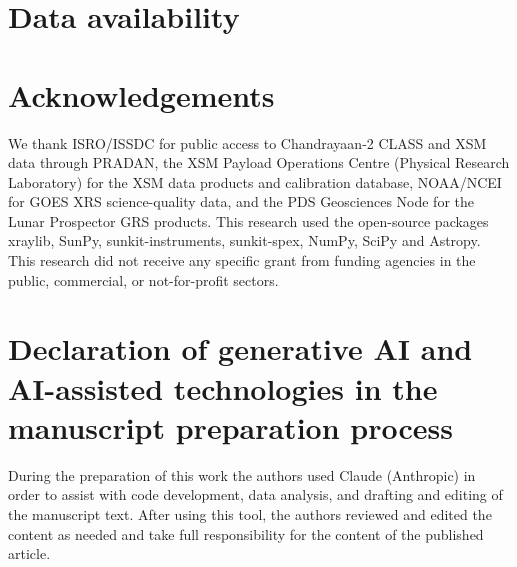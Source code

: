 \documentclass[final,5p,times,twocolumn,authoryear]{elsarticle}
\begin{document}
\begin{table}[!h]
\centering
\tiny
\setlength{\tabcolsep}{2pt}
\caption{Per-month exposure counts, mapping-set size, monthly gain $g$ and offset $o$, the detector-temperature (TEMP) range of the dayside spectra, the range of the Al K$\alpha$ FWHM over the temperature bins of the calibration (\cref{sec:calib}), and the particle-template source. A dash in the TEMP column, with a single FWHM value, marks a month with too few spectra for temperature bins, which uses one calibration for the whole month.}\label{tab:months}

\end{table}

\begin{table}[!h]
\centering
\scriptsize
\caption{Dayside exposure counts and mapping-quality pass fractions for the \NArchEarly{} available monthly archives from December 2020 through December 2023 (pass: quality flag 0, GOES $\geq$ B1, $\geq$300 counts). The February 2022 -- December 2023 archives define epoch B in \cref{sec:epochs}.}\label{tab:early}

\end{table}

\section*{Data availability}


\section*{Acknowledgements}
We thank ISRO/ISSDC for public access to Chandrayaan-2 CLASS and XSM data through PRADAN, the XSM Payload Operations Centre (Physical Research Laboratory) for the XSM data products and calibration database, NOAA/NCEI for GOES XRS science-quality data, and the PDS Geosciences Node for the Lunar Prospector GRS products. This research used the open-source packages xraylib, SunPy, sunkit-instruments, sunkit-spex, NumPy, SciPy and Astropy. This research did not receive any specific grant from funding agencies in the public, commercial, or not-for-profit sectors.

\section*{Declaration of generative AI and AI-assisted technologies in the manuscript preparation process}
During the preparation of this work the authors used Claude (Anthropic) in order to assist with code development, data analysis, and drafting and editing of the manuscript text. After using this tool, the authors reviewed and edited the content as needed and take full responsibility for the content of the published article.



\end{document}
